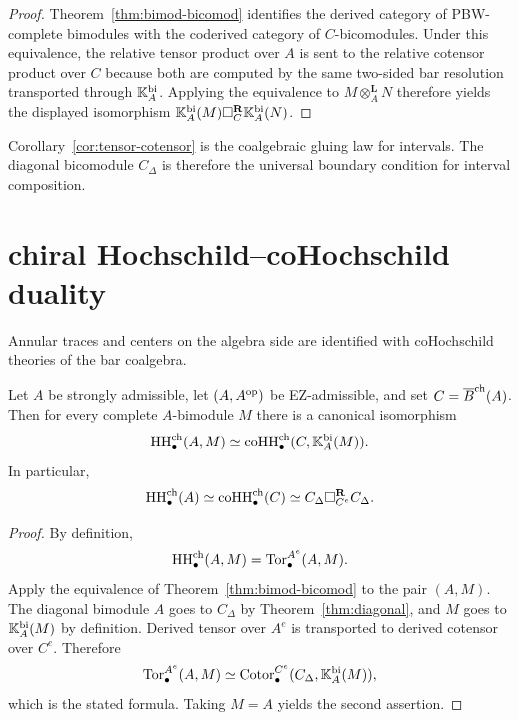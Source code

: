 \begin{proof}
Theorem~\ref{thm:bimod-bicomod} identifies the derived category of
PBW-complete bimodules with the coderived category of $C$-bicomodules.
Under this equivalence, the relative tensor product over $A$ is sent to
the relative cotensor product over $C$ because both are computed by the
same two-sided bar resolution transported through
$\mathbb{K}_A^{\mathrm{bi}}$.
Applying the equivalence to $M\otimes_A^{\mathbf L}N$ therefore yields
the displayed isomorphism
$\mathbb{K}_A^{\mathrm{bi}}(M)\square_C^{\mathbf R}\mathbb{K}_A^{\mathrm{bi}}(N)$.
\end{proof}

\begin{remark}
Corollary~\ref{cor:tensor-cotensor} is the coalgebraic gluing law for intervals.
The diagonal bicomodule $C_\Delta$ is therefore the universal boundary condition for interval
composition.
\end{remark}

\section{chiral Hochschild--coHochschild duality}
\label{sec:HH-coHH}

Annular traces and centers on the algebra side are identified with coHochschild theories of the bar
coalgebra.

\begin{theorem}
\ClaimStatusProvedHere
\label{thm:HH-coHH-homology}
Let $A$ be strongly admissible, let $(A,A^{\mathrm{op}})$ be EZ-admissible, and set $C=\overline{B}^{\mathrm{ch}}(A)$.
Then for every complete $A$-bimodule $M$ there is a canonical isomorphism
\[
\operatorname{HH}^{\mathrm{ch}}_\bullet(A,M)\simeq
\operatorname{coHH}^{\mathrm{ch}}_\bullet(C,\mathbb{K}_A^{\mathrm{bi}}(M)).
\]
In particular,
\[
\operatorname{HH}^{\mathrm{ch}}_\bullet(A)\simeq \operatorname{coHH}^{\mathrm{ch}}_\bullet(C)
\simeq
C_\Delta \square_{C^e}^{\mathbf R} C_\Delta.
\]
\end{theorem}

\begin{proof}
By definition,
\[
\operatorname{HH}^{\mathrm{ch}}_\bullet(A,M)=\operatorname{Tor}_\bullet^{A^e}(A,M).
\]
Apply the equivalence of Theorem~\ref{thm:bimod-bicomod} to the pair $(A,M)$.
The diagonal bimodule $A$ goes to $C_\Delta$ by Theorem~\ref{thm:diagonal}, and $M$ goes to
$\mathbb{K}_A^{\mathrm{bi}}(M)$ by definition. Derived tensor over $A^e$ is transported to derived cotensor
over $C^e$. Therefore
\[
\operatorname{Tor}_\bullet^{A^e}(A,M)\simeq \operatorname{Cotor}_\bullet^{C^e}(C_\Delta,\mathbb{K}_A^{\mathrm{bi}}(M)),
\]
which is the stated formula. Taking $M=A$ yields the second assertion.
\end{proof}

